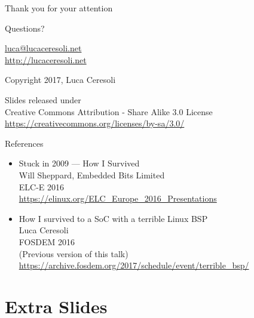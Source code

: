 \documentclass[xetex,table,aspectratio=169]{beamer}
\begin{document}
\begin{frame}
  \begin{center}
    Thank you for your attention

    \vspace{0.15\textheight}

    {\Huge Questions?}

    \vspace{0.15\textheight}

    \href{mailto:luca@lucaceresoli.net}{luca@lucaceresoli.net}\\
    \url{http://lucaceresoli.net}

    \textcopyright{} Copyright 2017, Luca Ceresoli\\

    \vspace{0.05\textheight}

    \tiny
    Slides released under\\
    Creative Commons Attribution - Share Alike 3.0 License \\
    \url{https://creativecommons.org/licenses/by-sa/3.0/} \\
\end{center}
\end{frame}

\begin{frame}{References}
  \begin{itemize}
    \item
      Stuck in 2009 --- How I Survived\\
      Will Sheppard, Embedded Bits Limited\\
      ELC-E 2016\\
      {\scriptsize\url{https://elinux.org/ELC_Europe_2016_Presentations}}
    \item
      How I survived to a SoC with a terrible Linux BSP\\
      Luca Ceresoli\\
      FOSDEM 2016\\
      (Previous version of this talk)\\
      {\scriptsize\url{https://archive.fosdem.org/2017/schedule/event/terrible_bsp/}}
  \end{itemize}
\end{frame}

\appendix

\section{Extra Slides}
\end{document}
